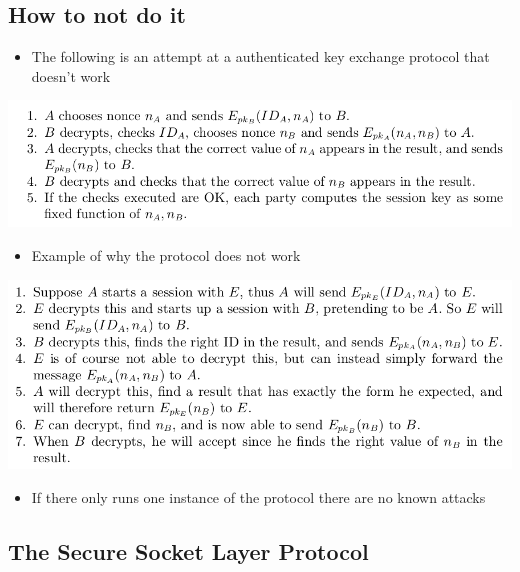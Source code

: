 \documentclass[11pt]{article}
\begin{document}
\subsection{How to not do it}
\label{sec:org302efb9}
\begin{itemize}
\item The following is an attempt at a authenticated key exchange protocol that doesn't work
\end{itemize}
\begin{center}
\includegraphics[width=.9\linewidth]{Network Security Mechanisms (12)/screenshot_2018-11-11_20-06-22.png}
\end{center}

\begin{itemize}
\item Example of why the protocol does not work
\end{itemize}
\begin{center}
\includegraphics[width=.9\linewidth]{Network Security Mechanisms (12)/screenshot_2018-11-11_20-06-40.png}
\end{center}

\begin{itemize}
\item If there only runs one instance of the protocol there are no known attacks
\end{itemize}

\subsection{The Secure Socket Layer Protocol}
\label{sec:org658953b}
\end{document}
